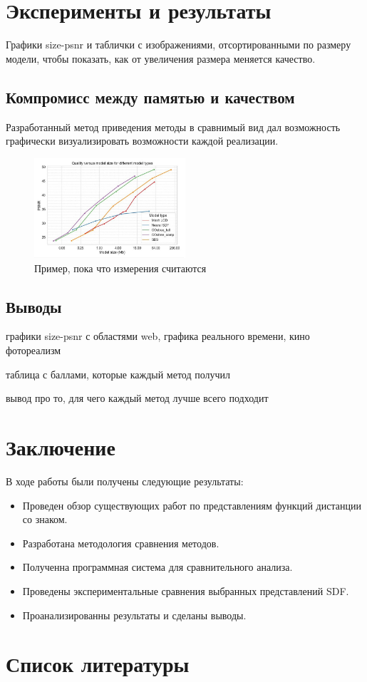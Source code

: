 \documentclass[a4paper,hidelinks,12pt]{article}
\begin{document}
\newpage

\section{Эксперименты и результаты}

Графики size-psnr и таблички с изображениями, отсортированными по размеру модели, чтобы показать, как от увеличения размера меняется качество.

\subsection{Компромисс между памятью и качеством}

Разработанный метод приведения методы в сравнимый вид дал возможность графически визуализировать возможности каждой реализации.

\begin{figure}[ht]
  \centering
  \includegraphics[width=0.5\textwidth]{example.jpg}
  \caption{Пример, пока что измерения считаются}
  \label{fig:example}
\end{figure}

\subsection{Выводы}

графики size-psnr с областями web, графика реального времени, кино фотореализм

таблица с баллами, которые каждый метод получил

вывод про то, для чего каждый метод лучше всего подходит

\newpage

\section{Заключение}

В ходе работы были получены следующие результаты:

\begin{itemize}
	\item Проведен обзор существующих работ по представлениям функций дистанции со знаком.
	\item Разработана методология сравнения методов.
	\item Полученна программная система для сравнительного анализа.
	\item Проведены экспериментальные сравнения выбранных представлений SDF.
	\item Проанализированны результаты и сделаны выводы.
\end{itemize}

\newpage

\section{Список литературы}
\end{document}
